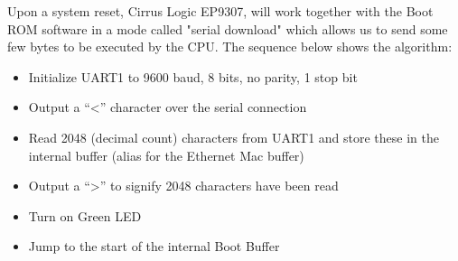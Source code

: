 \documentclass[conference]{IEEEtran}
\newcommand{\nota}[1]{}
\begin{document}
\nota{Afortunadamente, en un reinicio, el Cirrus EP9307, en conjunción
con el software de la BootROM, operan en un modo llamado 
``download en serie'', que nos permite enviar unos pocos
bytes para ser ejecutados por la CPU. Internamente, en un evento de reinicio,
estos componentes (CPU y BootROM) trabajan de la siguiente manera:}

Upon a system reset, Cirrus Logic EP9307, will work together with the Boot ROM software in a mode called "serial download" which allows us to send some few bytes to be executed by the CPU. The sequence below shows the algorithm:

\nota{\begin{enumerate}
\item Se inicializa el UART1 a 9600 baudios, 8 bits, sin paridad, 1 bit de stop.
\item Se envía por esa conexión serie el caracter ``\textgreater''
\item Se leen desde el sistema embebido, 2048 bytes provenientes
de la conexión serie, y se almacenan en una buffer de inicio interno.
\item Decisión:
\begin{itemize}
\item Si el otro extremo de la conexión serie (por ejemplo, nuestra PC) no envía los 2048 bytes, el sistema continúa el proceso de arranque utilizando la memoria interna FLASH.
\item Si el extremo de la conexión serie envió los 2048 bytes, entonces se envía desde el sistema (SOC) otro caracter ``\textgreater'' a través de la conexión serie, para indicar que 
se leyeron correctamente.
\end{itemize}
\item Finalmente, la CPU ``salta'' a la dirección del buffer de boot interno,
para continuar leyendo instrucciones desde
los 2048 bytes leídos.
\end{enumerate} } 

\begin{itemize}
\item Initialize UART1 to 9600 baud, 8 bits, no parity, 1 stop bit
\item Output a ``\textless'' character over the serial connection
\item Read 2048 (decimal count) characters from UART1 and store these in the internal buffer (alias for the Ethernet Mac buffer)
\item Output a ``\textgreater'' to signify 2048 characters have been read
\item Turn on Green LED
\item Jump to the start of the internal Boot Buffer
\end{itemize}
\end{document}

